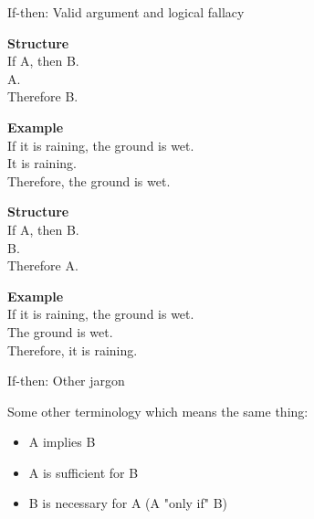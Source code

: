 \documentclass[10pt]{beamer}
\begin{document}
\begin{frame}{If-then: Valid argument and logical fallacy}

\begin{mygreenbox}[title=\textit{Modus Ponens} (A valid argument) \greencheck]
    \begin{minipage}[t]{0.35\linewidth}
    \textbf{Structure} \\
       If A, then B. \\
       A. \\
       Therefore B.
    \end{minipage}\hfill
    \begin{minipage}[t]{0.60\linewidth}
    \textbf{Example} \\
       If it is raining, the ground is wet. \\
       It is raining. \\
       Therefore, the ground is wet.
    \end{minipage}
\end{mygreenbox}

\vspace{0.5cm}
\pause 

\begin{myredbox}[title=\textit{Affirming the Consequent} (A logical fallacy) \redx]
    \begin{minipage}[t]{0.35\linewidth}
    \textbf{Structure} \\
       If A, then B. \\
       B. \\
       Therefore A.
    \end{minipage}\hfill
     \begin{minipage}[t]{0.60\linewidth}
    \textbf{Example} \\
       If it is raining, the ground is wet. \\
       The ground is wet. \\
       Therefore, it is raining.
    \end{minipage}
\end{myredbox}

\end{frame}



\begin{frame}{If-then: Other jargon}

Some other terminology which means the same thing:
\begin{itemize}
\item A implies B
\item A is sufficient for B
\item B is necessary for A (A "only if" B)
\end{itemize}
 
	
\end{frame}
\end{document}

